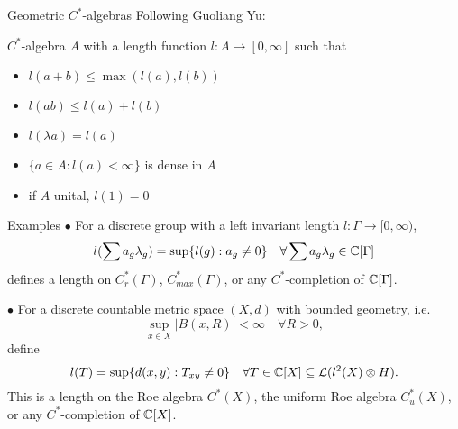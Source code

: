 \begin{frame}{Geometric $C^*$-algebras}
Following Guoliang Yu:
\begin{definition}
$C^*$-algebra $A$ with a length function $l: A \rightarrow [0,\infty]$ such that
\begin{itemize}
\item $l(a+b)\leq \max (l(a), l(b))$
\item $l(ab)\leq l(a)+ l(b)$
\item $l(\lambda a )= l (a)$
\item $\{a\in A : l(a)< \infty\}$ is dense in $A$
\item if $A$ unital, $l(1)=0$
\end{itemize}
\end{definition}
\end{frame}

\begin{frame}{Examples}
$\bullet$ For a discrete group with a left invariant length $l: \Gamma \rightarrow [0,\infty)$, 
\[l(\sum a_g \lambda_g) = \sup \{ l(g) : a_g \neq 0 \} \quad \forall \sum a_g \lambda_g \in \mathbb C [\Gamma]  \]
defines a length on $C_r^*(\Gamma)$, $C_{max}^*(\Gamma)$, or any $C^*$-completion of $\mathbb C [\Gamma]  $.\\

\vspace{0.5in}
 
$\bullet$ For a discrete countable metric space  $(X,d)$ with bounded geometry, i.e. 
\[\sup_{x \in X} |B(x,R)| < \infty \quad \forall R>0 , \]
define
\[l(T) = \sup \{ d(x,y) : T_{xy}\neq 0 \} \quad \forall T\in \mathbb C [X] \subseteq \mathcal L(l^2(X)\otimes H).  \]
This is a length on the Roe algebra $C^*(X)$, the uniform Roe algebra $C_{u}^*(X)$, or any $C^*$-completion of $\mathbb C [X]  $.\\
\end{frame}


